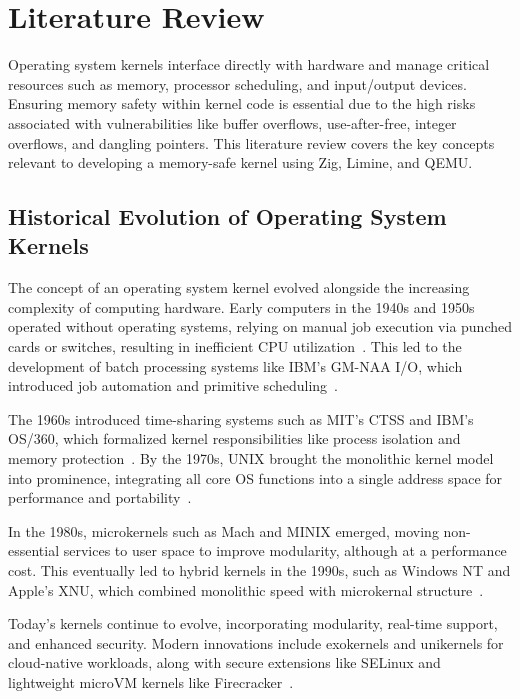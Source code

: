 \documentclass[12pt]{extarticle}
\begin{document}
\section{Literature Review}

Operating system kernels interface directly with hardware and manage critical
resources such as memory, processor scheduling, and input/output devices.
Ensuring memory safety within kernel code is essential due to the high risks
associated with vulnerabilities like buffer overflows, use-after-free, integer
overflows, and dangling pointers. This literature review covers the key concepts
relevant to developing a memory-safe kernel using Zig, Limine, and QEMU.

\subsection{Historical Evolution of Operating System Kernels}

The concept of an operating system kernel evolved alongside the increasing complexity of computing hardware. Early computers in the 1940s and 1950s operated without operating systems, relying on manual job execution via punched cards or switches, resulting in inefficient CPU utilization~\cite{tanenbaum2015}. This led to the development of batch processing systems like IBM's GM-NAA I/O, which introduced job automation and primitive scheduling~\cite{silberschatz2018}.
\vspace{1em}

The 1960s introduced time-sharing systems such as MIT's CTSS and IBM's OS/360, which formalized kernel responsibilities like process isolation and memory protection~\cite{ceruzzi2003}. By the 1970s, UNIX brought the monolithic kernel model into prominence, integrating all core OS functions into a single address space for performance and portability~\cite{ritchie1974}.
\vspace{1em}

In the 1980s, microkernels such as Mach and MINIX emerged, moving non-essential services to user space to improve modularity, although at a performance cost. This eventually led to hybrid kernels in the 1990s, such as Windows NT and Apple's XNU, which combined monolithic speed with microkernal structure~\cite{russinovich2017}.
\vspace{1em}

Today's kernels continue to evolve, incorporating modularity, real-time support, and enhanced security. Modern innovations include exokernels and unikernels for cloud-native workloads, along with secure extensions like SELinux and lightweight microVM kernels like Firecracker~\cite{kaashoek1997}.
\end{document}
